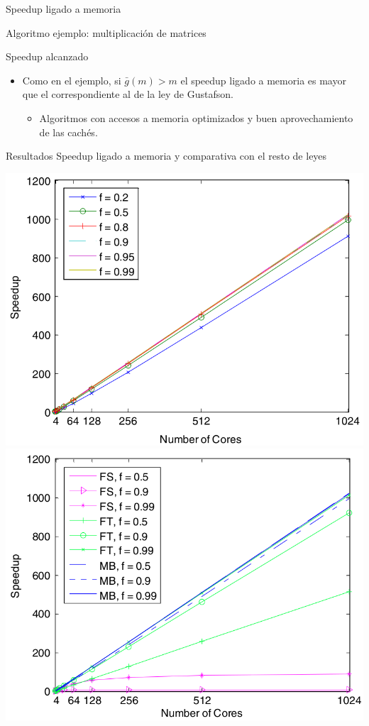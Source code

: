 \documentclass[utf8]{beamer}
\begin{document}
\begin{frame}[allowframebreaks]{Speedup ligado a memoria}
\begin{block}{Algoritmo ejemplo: multiplicación de matrices}
    \end{block}
    \begin{block}{Speedup alcanzado}
        \begin{itemize}
            \item Como en el ejemplo, si $\bar{g}(m) > m$ el speedup ligado a memoria es mayor que el correspondiente al de la ley de Gustafson.
                \begin{itemize}
                    \item Algoritmos con accesos a memoria optimizados y buen aprovechamiento de las cachés.
                \end{itemize}
        \end{itemize}
    \end{block}
    \begin{block}{Resultados}
        Speedup ligado a memoria y comparativa con el resto de leyes
    \end{block}
    \begin{center}
        \includegraphics[width=.5\linewidth]{figures/mb_speedup}
        \includegraphics[width=.5\linewidth]{figures/all_speedups}
    \end{center}
\end{frame}
\end{document}
